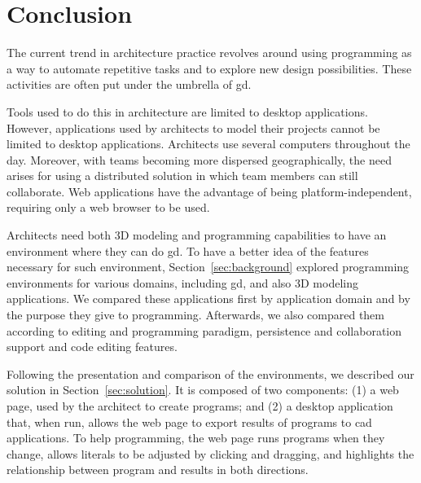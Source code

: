 
\section{Conclusion}
\label{sec:conclusion}


The current trend in architecture practice revolves around using programming as a way to automate repetitive tasks and to explore new design possibilities.
These activities are often put under the umbrella of \acrfull{gd}.

Tools used to do this in architecture are limited to desktop applications.
However, applications used by architects to model their projects cannot be limited to desktop applications.
Architects use several computers throughout the day.
Moreover, with teams becoming more dispersed geographically, the need arises for using a distributed solution in which team members can still collaborate.
Web applications have the advantage of being platform-independent, requiring only a web browser to be used.

Architects need both 3D modeling and programming capabilities to have an environment where they can do \gls{gd}.
To have a better idea of the features necessary for such environment, Section~\ref{sec:background} explored programming environments for various domains, including \gls{gd}, and also 3D modeling applications.
We compared these applications first by application domain and by the purpose they give to programming.
Afterwards, we also compared them according to editing and programming paradigm, persistence and collaboration support and code editing features.

Following the presentation and comparison of the environments, we described our solution in Section~\ref{sec:solution}.
It is composed of two components:
(1) a web page, used by the architect to create programs;
and (2) a desktop application that, when run, allows the web page to export results of programs to \gls{cad} applications.
To help programming, the web page runs programs when they change, allows literals to be adjusted by clicking and dragging, and highlights the relationship between program and results in both directions.

